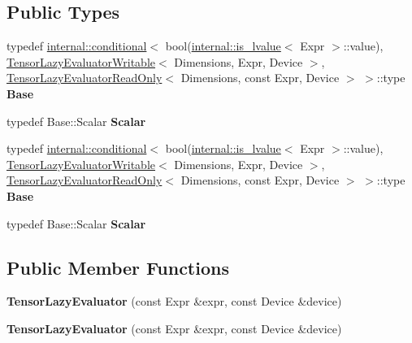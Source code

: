 \subsection*{Public Types}
\begin{DoxyCompactItemize}
\item 
\mbox{\label{class_eigen_1_1internal_1_1_tensor_lazy_evaluator_a212a70700e530576fb4a20c2b2ba593b}} 
typedef \hyperlink{struct_eigen_1_1internal_1_1conditional}{internal\+::conditional}$<$ bool(\hyperlink{struct_eigen_1_1internal_1_1is__lvalue}{internal\+::is\+\_\+lvalue}$<$ Expr $>$\+::value), \hyperlink{class_eigen_1_1internal_1_1_tensor_lazy_evaluator_writable}{Tensor\+Lazy\+Evaluator\+Writable}$<$ Dimensions, Expr, Device $>$, \hyperlink{class_eigen_1_1internal_1_1_tensor_lazy_evaluator_read_only}{Tensor\+Lazy\+Evaluator\+Read\+Only}$<$ Dimensions, const Expr, Device $>$ $>$\+::type {\bfseries Base}
\item 
\mbox{\label{class_eigen_1_1internal_1_1_tensor_lazy_evaluator_a416a20eb3e54981ef2ee785313d2702f}} 
typedef Base\+::\+Scalar {\bfseries Scalar}
\item 
\mbox{\label{class_eigen_1_1internal_1_1_tensor_lazy_evaluator_a212a70700e530576fb4a20c2b2ba593b}} 
typedef \hyperlink{struct_eigen_1_1internal_1_1conditional}{internal\+::conditional}$<$ bool(\hyperlink{struct_eigen_1_1internal_1_1is__lvalue}{internal\+::is\+\_\+lvalue}$<$ Expr $>$\+::value), \hyperlink{class_eigen_1_1internal_1_1_tensor_lazy_evaluator_writable}{Tensor\+Lazy\+Evaluator\+Writable}$<$ Dimensions, Expr, Device $>$, \hyperlink{class_eigen_1_1internal_1_1_tensor_lazy_evaluator_read_only}{Tensor\+Lazy\+Evaluator\+Read\+Only}$<$ Dimensions, const Expr, Device $>$ $>$\+::type {\bfseries Base}
\item 
\mbox{\label{class_eigen_1_1internal_1_1_tensor_lazy_evaluator_a416a20eb3e54981ef2ee785313d2702f}} 
typedef Base\+::\+Scalar {\bfseries Scalar}
\end{DoxyCompactItemize}
\subsection*{Public Member Functions}
\begin{DoxyCompactItemize}
\item 
\mbox{\label{class_eigen_1_1internal_1_1_tensor_lazy_evaluator_a0d5171b7ba328f4c8564327d8cd9156f}} 
{\bfseries Tensor\+Lazy\+Evaluator} (const Expr \&expr, const Device \&device)
\item 
\mbox{\label{class_eigen_1_1internal_1_1_tensor_lazy_evaluator_a0d5171b7ba328f4c8564327d8cd9156f}} 
{\bfseries Tensor\+Lazy\+Evaluator} (const Expr \&expr, const Device \&device)
\end{DoxyCompactItemize}
